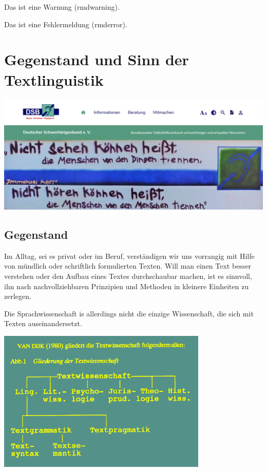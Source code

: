 \documentclass[
  letterpaper,
  DIV=11,
  numbers=noendperiod]{scrreprt}
\begin{document}
Das ist eine Warnung (rmdwarning).

Das ist eine Fehlermeldung (rmderror).


\hypertarget{sec-gegenstand}{%
\chapter{Gegenstand und Sinn der Textlinguistik}\label{sec-gegenstand}}

\includegraphics[width=1\textwidth,height=\textheight]{./pictures/DSB_SDH 2021-02-25 105118.png}

\hypertarget{gegenstand}{%
\section{Gegenstand}\label{gegenstand}}

Im Alltag, sei es privat oder im Beruf, verständigen wir uns vorrangig
mit Hilfe von mündlich oder schriftlich formulierten Texten. Will man
einen Text besser verstehen oder den Aufbau eines Textes durchschaubar
machen, ist es sinnvoll, ihn nach nachvollziehbaren Prinzipien und
Methoden in kleinere Einheiten zu zerlegen.

Die Sprachwissenschaft is allerdings nicht die einzige Wissenschaft, die
sich mit Texten auseinandersetzt.

\includegraphics[width=0.75\textwidth,height=\textheight]{./pictures/textwissenschaften.png}
\end{document}
